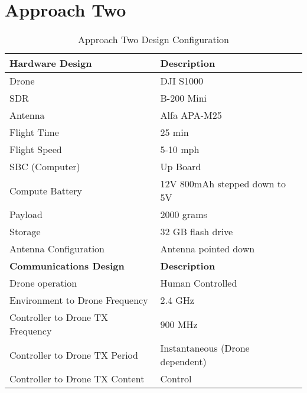 \section{Approach Two}
\begin{table}[h!]
\centering
\caption{Approach Two Design Configuration}
\label{table:approach_two}
\begin{tabular}{|l|l|}
    \hline  \textbf{Hardware Design}              & \textbf{Description}                      \\ \hline
            Drone                                 & DJI S1000                                 \\
            SDR                                   & B-200 Mini                                \\
            Antenna                               & Alfa APA-M25                              \\
            Flight Time                           & 25 min                                    \\
            Flight Speed                          & 5-10 mph                                  \\
            SBC (Computer)                        & Up Board                                  \\
            Compute Battery                       & 12V 800mAh stepped down to 5V             \\
            Payload                               & 2000 grams                                \\
            Storage                               & 32 GB flash drive                         \\
            Antenna Configuration                 & Antenna pointed down                      \\
    \hline  \textbf{Communications Design}        & \textbf{Description}                      \\ \hline
            Drone operation                       & Human Controlled                          \\
            Environment to Drone Frequency        & 2.4 GHz                                   \\
            Controller to Drone TX Frequency      & 900 MHz                                   \\
            Controller to Drone TX Period         & Instantaneous (Drone dependent)           \\
            Controller to Drone TX Content        & Control                                   \\

\end{tabular}
\end{table}
